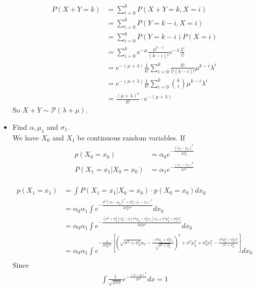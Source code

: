 \documentclass{article}
\begin{document}
\begin{itemize}
\begin{align*}
  P(X+ Y =k) &= \sum_{i = 0}^k P(X+ Y = k, X = i)\\
    &= \sum_{i=0}^k P(Y = k-i , X =i)\\
    &= \sum_{i=0}^k P(Y = k-i)P(X=i)\\
    &= \sum_{i=0}^k e^{-\mu}\frac{\mu^{k-i}}{(k-i)!}e^{-\lambda}\frac{\lambda^i}{i!}\\
   &= e^{-(\mu + \lambda)}\frac 1{k!}\sum_{i=0}^k \frac{k!}{i!(k-i)!}\mu^{k-i}\lambda^i\\
   &= e^{-(\mu + \lambda)}\frac 1{k!}\sum_{i=0}^k \binom ki\mu^{k-i}\lambda^i\\
   &= \frac{(\mu + \lambda)^k}{k!} \cdot e^{-(\mu + \lambda)}
\end{align*}
So $X + Y \sim \mathcal{P}(\lambda + \mu)$.\\
\item Find $\alpha, \mu_{1}$ and $\sigma_{1}$.\\
We have $X_{0}$ and $X_{1}$ be continuous random variables. If\\
\begin{align*}
    p(X_{0} = x_{0}) &= \alpha_{0}e^{-\frac{(x_{0} - \mu_{0})^2}{2\sigma_{0}^2}}\\
    P(X_{1} = x_{1}|X_{0} = x_{0}) &= \alpha_{1}e^{-\frac{(x_{1} - x_{0})^2}{2\sigma^2}}
\end{align*}\\
\begin{align*}
    p(X_{1} = x_{1}) &= \int P(X_{1} = x_{1}|X_{0} = x_{0}) \cdot p(X_{0} = x_{0}) d x_{0}\\
    &= \alpha_{0}\alpha_{1}\int e ^{-\frac{\sigma^2(x_{0} - \mu_{0})^2 + \sigma_{0}^2(x_{1} - x_{0})^2}{2\sigma_{0}^2\sigma^2}}d x_{0}\\
    &= \alpha_{0}\alpha_{1}\int e ^{-\frac{(\sigma^2 + \sigma_{0}^2)x_{0}^2 - 2(\sigma^2\mu_{0} + \sigma_{0}^2x_{1})x_{0} + \sigma^2\mu_{0}^2 + \sigma_{0}^2x_{1}^2}{2\sigma_{0}^2\sigma^2}}d x_{0}\\
    &= \alpha_{0}\alpha_{1}\int e^{-\frac{1}{2\sigma_{0}^2\sigma^2}[(\sqrt{\sigma^2 + \sigma_{0}^2}x_{0} - \frac{-\sigma^2\mu_{0} + \sigma_{0}^2x_{1}}{\sqrt{\sigma^2 + \sigma_{0}^2}})^2 + \sigma^2\mu_{0}^2 + \sigma_{0}^2x_{1}^2 - \frac{\sigma^2\mu_{0}^2 + \sigma_{0}^2x_{1}^2}{\sigma^2 + \sigma_{0}^2}]} d x_{0}\\
\end{align*}
Since \begin{align*}
    \int \frac{1}{\sqrt{2\pi \sigma}}e^{-\frac{(x - \mu) ^ 2}{2\sigma^2}}d x = 1

\end{align*}
\end{itemize}
\end{document}
